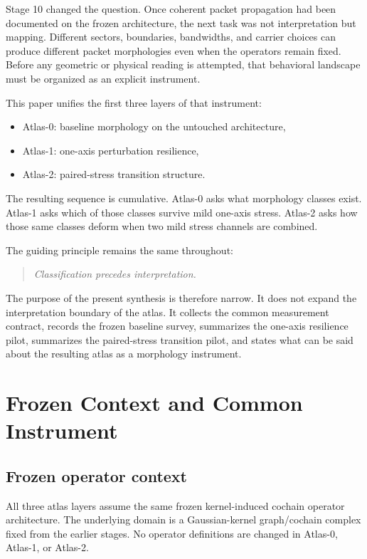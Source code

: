 \documentclass[11pt]{article}
\begin{document}
Stage 10 changed the question. Once coherent packet propagation had been documented on the frozen architecture, the next task was not interpretation but mapping. Different sectors, boundaries, bandwidths, and carrier choices can produce different packet morphologies even when the operators remain fixed. Before any geometric or physical reading is attempted, that behavioral landscape must be organized as an explicit instrument.

This paper unifies the first three layers of that instrument:
\begin{itemize}
\item Atlas-0: baseline morphology on the untouched architecture,
\item Atlas-1: one-axis perturbation resilience,
\item Atlas-2: paired-stress transition structure.
\end{itemize}
The resulting sequence is cumulative. Atlas-0 asks what morphology classes exist. Atlas-1 asks which of those classes survive mild one-axis stress. Atlas-2 asks how those same classes deform when two mild stress channels are combined.

The guiding principle remains the same throughout:
\begin{quote}
\emph{Classification precedes interpretation.}
\end{quote}

The purpose of the present synthesis is therefore narrow. It does not expand the interpretation boundary of the atlas. It collects the common measurement contract, records the frozen baseline survey, summarizes the one-axis resilience pilot, summarizes the paired-stress transition pilot, and states what can be said about the resulting atlas as a morphology instrument.

\section{Frozen Context and Common Instrument}
\subsection{Frozen operator context}
All three atlas layers assume the same frozen kernel-induced cochain operator architecture. The underlying domain is a Gaussian-kernel graph/cochain complex fixed from the earlier stages. No operator definitions are changed in Atlas-0, Atlas-1, or Atlas-2.
\end{document}
